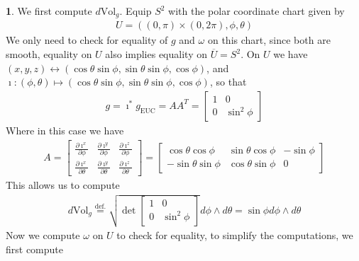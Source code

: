 \documentclass[10.5pt]{article}
\theoremstyle{definition}
\newtheorem{pb}{}
\newcommand{\z}{\imath}
\begin{document}
    \begin{pb}
        We first compute \(d\text{Vol}_g\). Equip \(S^2\) with the polar coordinate chart given by
        \begin{align*}
            U = ((0,\pi) \times (0,2\pi),\phi,\theta)
        \end{align*}
        We only need to check for equality of \(g\) and \(\omega\) on this chart, since both are smooth, equality on \(U\) also implies equality on \(\overline{U} = S^2\).
        On \(U\) we have \((x,y,z) \longleftrightarrow (\cos\theta\sin\phi,\sin\theta\sin\phi,\cos\phi)\), and \newline
        \(\z: (\phi,\theta) \mapsto (\cos\theta\sin\phi,\sin\theta\sin\phi,\cos\phi)\), so that
        \begin{align*}
            g = \z^*g_{\text{EUC}} = AA^T = \begin{bmatrix} 1 & 0 \\ 0 & \sin^2\phi \end{bmatrix}
        \end{align*}
        Where in this case we have
        \begin{align*}
            A =
            \begin{bmatrix}  
                \frac{\partial \z^x}{\partial \phi} & \frac{\partial \z^y}{\partial \phi} & \frac{\partial \z^z}{\partial \phi} \\
                \frac{\partial \z^x}{\partial \theta} & \frac{\partial \z^y}{\partial \theta} & \frac{\partial \z^z}{\partial \theta}
            \end{bmatrix}
            =
             \begin{bmatrix}
                \cos\theta\cos\phi & \sin\theta\cos\phi & -\sin\phi \\
                -\sin\theta\sin\phi & \cos\theta\sin\phi & 0
            \end{bmatrix}
        \end{align*}
        This allows us to compute
        \begin{align*}
            d\text{Vol}_g \overset{\text{def.}}{=} \sqrt{\det \begin{bmatrix} 1 & 0 \\ 0 & \sin^2\phi \end{bmatrix}}d\phi \wedge d\theta = \sin\phi d\phi \wedge d\theta
        \end{align*}
        Now we compute \(\omega\) on \(U\) to check for equality, to simplify the computations, we first compute
        \begin{align*}

\end{align*}
\end{pb}
\end{document}
